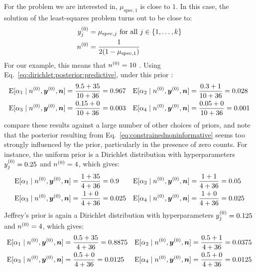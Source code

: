 For the problem we are interested in, $\mu_{\text{spec},1}$ is close to $1$.
In this case, the solution of the least-squares problem turns out to be close to:
\begin{equation}
 \label{eq:constrainednoninformative}
 \begin{split}
  y^{(0)}_j &= \mu_{\text{spec},j} \text{ for all $j\in\{1,\dots,k\}$} \\
  n^{(0)}   &= \frac{1}{2(1-\mu_{\text{spec},1})}
 \end{split}
\end{equation}
For our example, this means that $n^{(0)}=10$ \parencite[p.~400, \S 3]{2011:kelly:atwood}.
Using Eq.~\eqref{eq:dirichlet:posterior:predictive}, under this prior \parencite[p.~401, \S 3.1]{2011:kelly:atwood}:
\begin{align*}
  \operatorname{E}[\alpha_1\mid n^{(0)},{\bm y}^{(0)},{\bm n}] &= \frac{9.5 + 35}{10 + 36} = 0.967
  &
  \operatorname{E}[\alpha_2\mid n^{(0)},{\bm y}^{(0)},{\bm n}] &= \frac{0.3  + 1}{10 + 36} = 0.028
  \\
  \operatorname{E}[\alpha_3\mid n^{(0)},{\bm y}^{(0)},{\bm n}] &= \frac{0.15 + 0}{10 + 36} = 0.003
  &
  \operatorname{E}[\alpha_4\mid n^{(0)},{\bm y}^{(0)},{\bm n}] &= \frac{0.05 + 0}{10 + 36} = 0.001
\end{align*}
\textcite[p.~402, \S 4]{2011:kelly:atwood}
compare these results against a large number of other choices of priors,
and note that the posterior resulting from Eq.~\eqref{eq:constrainednoninformative}
seems too strongly influenced by the prior, particularly in the presence of zero counts.
For instance, the uniform prior is a Dirichlet distribution with hyperparameters
$y^{(0)}_j=0.25$ and $n^{(0)}=4$, which gives:
\begin{align*}
  \operatorname{E}[\alpha_1\mid n^{(0)},{\bm y}^{(0)},{\bm n}] &= \frac{1+35}{4+36} = 0.9
  &
  \operatorname{E}[\alpha_2\mid n^{(0)},{\bm y}^{(0)},{\bm n}] &= \frac{1+1}{4+36} = 0.05
  \\
  \operatorname{E}[\alpha_3\mid n^{(0)},{\bm y}^{(0)},{\bm n}] &= \frac{1+0}{4+36} = 0.025
  &
  \operatorname{E}[\alpha_4\mid n^{(0)},{\bm y}^{(0)},{\bm n}] &= \frac{1+0}{4+36} = 0.025
\end{align*}
Jeffrey's prior is again a Dirichlet distribution with hyperparameters
$y^{(0)}_j=0.125$ and $n^{(0)}=4$, which gives:
\begin{align*}
  \operatorname{E}[\alpha_1\mid n^{(0)},{\bm y}^{(0)},{\bm n}] &= \frac{0.5 + 35}{4+36} = 0.8875
  &
  \operatorname{E}[\alpha_2\mid n^{(0)},{\bm y}^{(0)},{\bm n}] &= \frac{0.5 + 1}{4+36} = 0.0375
  \\
  \operatorname{E}[\alpha_3\mid n^{(0)},{\bm y}^{(0)},{\bm n}] &= \frac{0.5 + 0}{4+36} = 0.0125
  &
  \operatorname{E}[\alpha_4\mid n^{(0)},{\bm y}^{(0)},{\bm n}] &= \frac{0.5 + 0}{4+36} = 0.0125
\end{align*}

